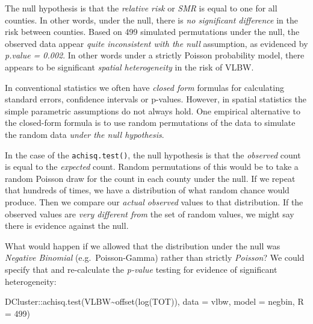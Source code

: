 \documentclass[
]{book}
\newenvironment{Shaded}{\begin{snugshade}}{\end{snugshade}}
\newcommand{\AttributeTok}[1]{\textcolor[rgb]{0.77,0.63,0.00}{#1}}
\newcommand{\DecValTok}[1]{\textcolor[rgb]{0.00,0.00,0.81}{#1}}
\newcommand{\FunctionTok}[1]{\textcolor[rgb]{0.00,0.00,0.00}{#1}}
\newcommand{\NormalTok}[1]{#1}
\newcommand{\SpecialCharTok}[1]{\textcolor[rgb]{0.00,0.00,0.00}{#1}}
\newcommand{\StringTok}[1]{\textcolor[rgb]{0.31,0.60,0.02}{#1}}
\newenvironment{rmdnote}[1]
  {
  \begin{itemize}
  \renewcommand{\labelitemi}{
    \raisebox{-.7\height}[0pt][0pt]{
      {\setkeys{Gin}{width=3em,keepaspectratio}\texttt{[image: images/\#1]}}
    }
  }
  \setlength{\fboxsep}{1em}
  \begin{note}
  \item
  }
  {
  \end{note}
  \end{itemize}
  }
\begin{document}
The null hypothesis is that the \emph{relative risk} or \emph{SMR} is equal to one for all counties. In other words, under the null, there is \emph{no significant difference} in the risk between counties. Based on 499 simulated permutations under the null, the observed data appear \emph{quite inconsistent with the null} assumption, as evidenced by \emph{p.value = 0.002}. In other words under a strictly Poisson probability model, there appears to be significant \emph{spatial heterogeneity} in the risk of VLBW.

\begin{rmdnote}{note}
In conventional statistics we often have \emph{closed form} formulas for calculating standard errors, confidence intervals or p-values. However, in spatial statistics the simple parametric assumptions do not always hold. One empirical alternative to the closed-form formula is to use random permutations of the data to simulate the random data \emph{under the null hypothesis}.

In the case of the \texttt{achisq.test()}, the null hypothesis is that the \emph{observed} count is equal to the \emph{expected} count. Random permutations of this would be to take a random Poisson draw for the count in each county under the null. If we repeat that hundreds of times, we have a distribution of what random chance would produce. Then we compare our \emph{actual observed} values to that distribution. If the observed values are \emph{very different from} the set of random values, we might say there is evidence against the null.

\end{rmdnote}

What would happen if we allowed that the distribution under the null was \emph{Negative Binomial} (e.g.~Poisson-Gamma) rather than strictly \emph{Poisson}? We could specify that and re-calculate the \emph{p-value} testing for evidence of significant heterogeneity:

\begin{Shaded}
\begin{Highlighting}[]
\NormalTok{DCluster}\SpecialCharTok{::}\FunctionTok{achisq.test}\NormalTok{(VLBW}\SpecialCharTok{\textasciitilde{}}\FunctionTok{offset}\NormalTok{(}\FunctionTok{log}\NormalTok{(TOT)), }
                      \AttributeTok{data =}\NormalTok{ vlbw, }
                      \AttributeTok{model =} \StringTok{\textquotesingle{}negbin\textquotesingle{}}\NormalTok{,}
                      \AttributeTok{R =} \DecValTok{499}\NormalTok{)}
\end{Highlighting}
\end{Shaded}
\end{document}
